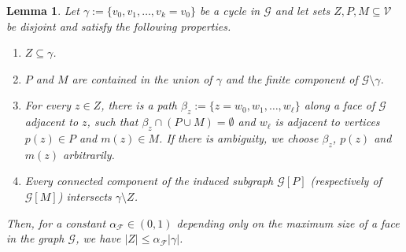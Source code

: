 \documentclass{daj}
\newtheorem{lemma}[theorem]{Lemma}
\newcommand{\G}{\mathcal{G}}
\newcommand{\V}{\mathcal{V}}
\begin{document}
\begin{lemma}\label{lemma:topological-lemma}
	Let $\gamma := \{v_0, v_1, \dots, v_k = v_0\}$ be a cycle in $\G$ and let sets $Z, P, M \subseteq \V$ be disjoint and satisfy the following properties.
	\begin{enumerate}
		\item $Z \subseteq \gamma$.
		\item $P$ and $M$ are contained in the union of $\gamma$ and the finite component of $\G \setminus \gamma$.
		\item For every $z \in Z$, there is a path $\beta_z := \{z = w_0, w_1, \dots, w_\ell\}$ along a face of $\G$ adjacent to $z$, such that $\beta_z \cap (P \cup M) = \emptyset$ and $w_\ell$ is adjacent to vertices $p(z) \in P$ and $m(z) \in M$. If there is ambiguity, we choose $\beta_z$, $p(z)$ and $m(z)$ arbitrarily.
		\item Every connected component of the induced subgraph $\G[P]$ (respectively of $\G[M]$) intersects $\gamma \setminus Z$.
	\end{enumerate}
	Then, for a constant $\alpha_{\mathcal{F}} \in (0,1)$ depending only on the maximum size of a face in the graph $\G$, we have $|Z| \leq \alpha_{\mathcal{F}} |\gamma|$.
\end{lemma}
\end{document}
